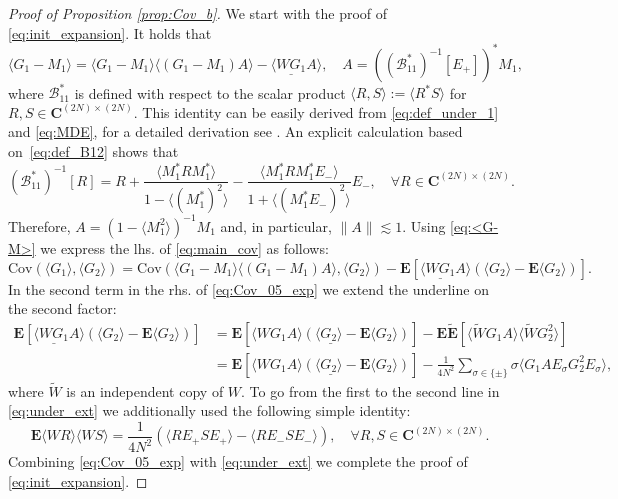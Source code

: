 \documentclass[10pt]{amsart}
\numberwithin{equation}{section}
\newcommand{\E}{\mathbf{E}}
\newcommand{\C}{\mathbf{C}}
\newcommand{\Cov}{\mathrm{Cov}}
\begin{document}
\begin{proof}[Proof of Proposition \ref{prop:Cov_b}] We start with the proof of \eqref{eq:init_expansion}. It holds that 
\begin{equation}
\langle G_1-M_1\rangle = \langle G_1-M_1\rangle \langle (G_1-M_1)A\rangle - \langle \underline{WG_1}A\rangle, \quad A=\left(\left(\mathcal{B}^*_{11}\right)^{-1}[E_+]\right)^*M_1,
\label{eq:<G-M>}
\end{equation}
where $\mathcal{B}^*_{11}$ is defined with respect to the scalar product $\langle R,S\rangle:=\langle R^*S\rangle$ for $R,S\in\C^{(2N)\times (2N)}$. This identity can be easily derived from \eqref{eq:def_under_1} and \eqref{eq:MDE}, for a detailed derivation see \cite[Eq.(6.9)]{macroCLT_complex}. An explicit calculation based on~\eqref{eq:def_B12} shows that
\begin{equation}
\left(\mathcal{B}^*_{11}\right)^{-1}[R] = R + \frac{\langle M^*_1RM^*_1\rangle}{1-\langle (M^*_1)^2\rangle} - \frac{\langle M^*_1RM^*_1E_-\rangle}{1+\langle (M^*_1E_-)^2\rangle}E_-,\quad \forall R\in\C^{(2N)\times (2N)}.
\label{eq:B*_inverse}
\end{equation}
Therefore, $A=(1-\langle M_1^2\rangle)^{-1}M_1$ and, in particular, $\|A\|\lesssim 1$. Using \eqref{eq:<G-M>} we express the lhs. of \eqref{eq:main_cov} as follows:
\begin{equation}
\Cov(\langle G_1\rangle, \langle G_2\rangle) = \Cov\left( \langle G_1-M_1\rangle \langle (G_1-M_1)A\rangle, \langle G_2\rangle\right) - \E \left[ \langle \underline{WG_1}A\rangle \left(\langle G_2\rangle - \E\langle G_2\rangle\right)\right].
\label{eq:Cov_05_exp}
\end{equation}
In the second term in the rhs. of \eqref{eq:Cov_05_exp} we extend the underline on the second factor:
\begin{equation}
\begin{split}
\E \left[ \langle \underline{WG_1}A\rangle \left(\langle G_2\rangle - \E\langle G_2\rangle\right)\right] &= \E \left[\underline{ \langle WG_1A\rangle \left(\langle G_2\rangle - \E\langle G_2\rangle\right)}\right] - \E \widetilde{\E} \left[ \langle \widetilde{W}G_1A\rangle \langle \widetilde{W}G_2^2\rangle\right]\\
&=\E \left[\underline{ \langle WG_1A\rangle \left(\langle G_2\rangle - \E\langle G_2\rangle\right)}\right] -\frac{1}{4N^2}\sum_{\sigma\in\{\pm\}} \sigma\langle G_1AE_\sigma G_2^2E_\sigma\rangle,
\end{split}
\label{eq:under_ext}
\end{equation}
where $\widetilde{W}$ is an independent copy of $W$. To go from the first to the second line in \eqref{eq:under_ext} we additionally used the following simple identity:
\begin{equation}
\E \langle WR\rangle \langle WS\rangle = \frac{1}{4N^2}\left(\langle RE_+SE_+\rangle - \langle RE_-SE_-\rangle\right),\quad \forall R,S\in\C^{(2N)\times (2N)}.
\label{eq:EWW_id}
\end{equation}
Combining \eqref{eq:Cov_05_exp} with \eqref{eq:under_ext} we complete the proof of \eqref{eq:init_expansion}.


\end{proof}
\end{document}
